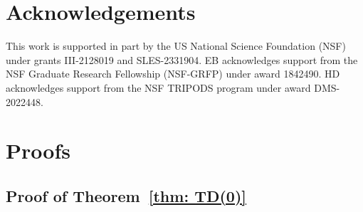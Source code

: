 \documentclass{article}
\newcommand{\tb}[1]{{\textbf{#1}}}
\begin{document}

\section*{Acknowledgements}
This work is supported in part by the US National Science Foundation (NSF) under grants III-2128019 and SLES-2331904. EB acknowledges support from the NSF Graduate Research Fellowship (NSF-GRFP) under award 1842490.
HD acknowledges support from the NSF TRIPODS program under award DMS-2022448.





\newpage

\appendix
\tableofcontents
\newpage
\section{Proofs}
\subsection{Proof of Theorem~\ref{thm: TD(0)}}
\label{sec proof of thm TD(0)}
\end{document}
